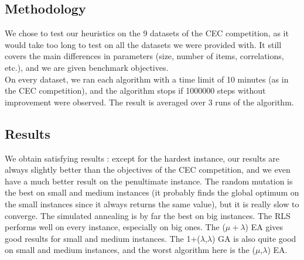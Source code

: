 \documentclass[a4paper]{article}
\begin{document}
\subsection{Methodology}
We chose to test our heuristics on the 9 datasets of the CEC competition, as it would take too long to test on all the datasets we were provided with. It still covers the main differences in parameters (size, number of items, correlations, etc.), and we are given benchmark objectives. \\
On every dataset, we ran each algorithm with a time limit of 10 minutes (as in the CEC competition), and the algorithm stops if 1000000 steps without improvement  were observed. The result is averaged over 3 runs of the algorithm.
\subsection{Results}
We obtain satisfying results : except for the hardest instance, our results are always slightly better than the objectives of the CEC competition, and we even have a much better result on the penultimate instance. The random mutation is the best on small and medium instances (it probably finds the global optimum on the small instances since it always returns the same value), but it is really slow to converge. The simulated annealing is by far the best on big instances. The RLS performs well on every instance, especially on big ones. The ($\mu + \lambda$) EA gives good results for small and medium instances. The 1+($\lambda$,$\lambda$) GA is also quite good on small and medium instances, and the worst algorithm here is the ($\mu$,$\lambda$) EA.

\begin{center}
\end{center}

\begin{center}
\end{center}

\begin{center}
\end{center}
\end{document}
